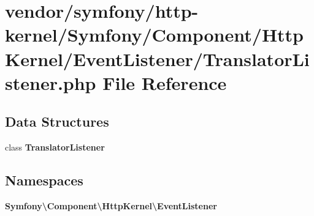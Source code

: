 \section{vendor/symfony/http-\/kernel/\+Symfony/\+Component/\+Http\+Kernel/\+Event\+Listener/\+Translator\+Listener.php File Reference}
\label{_translator_listener_8php}
\subsection*{Data Structures}
\begin{DoxyCompactItemize}
\item 
class {\bf Translator\+Listener}
\end{DoxyCompactItemize}
\subsection*{Namespaces}
\begin{DoxyCompactItemize}
\item 
 {\bf Symfony\textbackslash{}\+Component\textbackslash{}\+Http\+Kernel\textbackslash{}\+Event\+Listener}
\end{DoxyCompactItemize}

